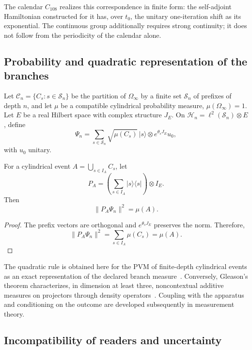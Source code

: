 The calendar \(C_{108}\) realizes this correspondence in finite form:
the self-adjoint Hamiltonian constructed for it has, over \(t_0\),
the unitary one-iteration shift as its exponential. The
continuous group additionally requires strong continuity; it does not follow
from the periodicity of the calendar alone.

\subsection{Probability and quadratic representation of the branches}

Let \(\mathcal C_n=\{C_s:s\in\mathcal S_n\}\) be the partition of
\(\Omega_\infty\) by a finite set \(\mathcal S_n\) of prefixes of
depth \(n\), and let \(\mu\) be a compatible cylindrical probability
measure, \(\mu(\Omega_\infty)=1\). Let \(E\) be a real Hilbert space
with complex structure \(J_E\). On
\(\mathcal H_n=\ell^2(\mathcal S_n)\otimes E\), define
\begin{equation}
 \Psi_n=\sum_{s\in\mathcal S_n}
 \sqrt{\mu(C_s)}\,|s\rangle\otimes e^{\theta_s J_E}u_0,
 \label{eq:estado-amplitudes-medida-rev2}
\end{equation}
with \(u_0\) unitary.

\begin{theorem}
\label{thm:born-cilindrico-rev2}
For a cylindrical event
\(A=\bigcup_{s\in I_A}C_s\), let
\[
 P_A=\left(\sum_{s\in I_A}|s\rangle\langle s|\right)\otimes I_E.
\]
Then
\[
 \|P_A\Psi_n\|^2=\mu(A).
\]
\end{theorem}

\begin{proof}
The prefix vectors are orthogonal and
\(e^{\theta_s J_E}\) preserves the norm. Therefore,
\[
 \|P_A\Psi_n\|^2
 =\sum_{s\in I_A}\mu(C_s)=\mu(A).
\]
\end{proof}

The quadratic rule is obtained here for the PVM of finite-depth cylindrical
events as an exact representation of the declared branch
measure~\cite{Born1926}. Conversely, Gleason's theorem
characterizes, in dimension at least three, noncontextual additive measures
on projectors through density operators~\cite{Gleason1957}. Coupling
with the apparatus and conditioning on the outcome are developed
subsequently in measurement theory.

\subsection{Incompatibility of readers and uncertainty}

